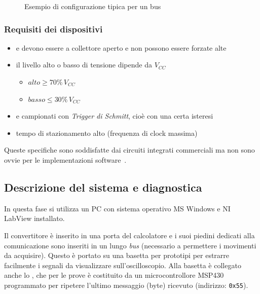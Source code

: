 \begin{figure}
  \centering
  \resizebox{.9\linewidth}{!}{}
  \caption{Esempio di configurazione tipica per un bus \iic}
  \label{fig:i2c_tipica}
\end{figure}



\subsubsection{Requisiti dei dispositivi}
\begin{itemize}
  \item {\sda{} e \scl{} devono essere a collettore aperto e non possono essere forzate alte}
  \item {il livello alto o basso di tensione dipende da $V_{CC}$}
  \begin{itemize}
	\item {\(alto \geq 70\%\,V_{CC}\)} 
	\item {\(basso \leq 30\%\,V_{CC}\)}
  \end{itemize}
  \item {\sda{} e \scl{} campionati con \emph{Trigger di Schmitt}, cioè con una certa isteresi}
  \item {tempo di stazionamento alto (frequenza di clock massima)}
\end{itemize}
Queste specifiche sono soddisfatte dai circuiti integrati commerciali
ma non sono ovvie per le implementazioni software~\cite{cit:primer}.

%   

\subsection{Descrizione del sistema e diagnostica}
In questa fase si utilizza un {PC}
con sistema operativo MS Windows e NI LabView installato.

Il convertitore è inserito in una porta {\usb} del calcolatore
e i suoi piedini dedicati alla comunicazione {\iic} sono inseriti
in un lungo \textit{bus} (necessario a permettere i movimenti da acquisire).
Questo è portato su una basetta per prototipi
per estrarre facilmente i segnali da visualizzare sull'oscilloscopio.
Alla basetta è collegato anche lo {\slave}, che per le prove
è costituito da un microcontrollore {MSP430}
programmato per ripetere l'ultimo messaggio (byte) ricevuto
(indirizzo: \texttt{0x55}).

